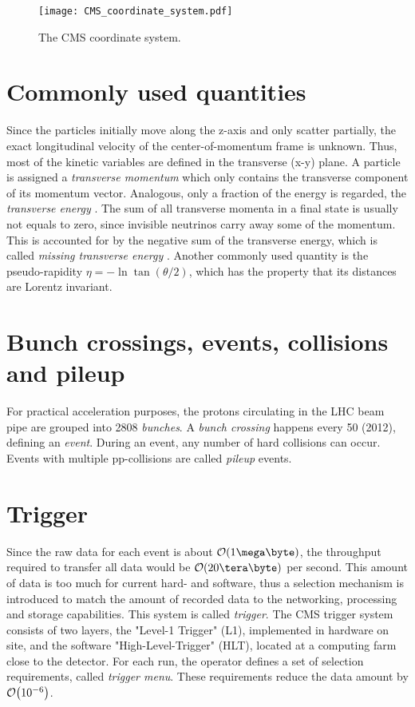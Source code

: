 \begin{figure}[htbp]
	\centering
	\texttt{[image: CMS\_coordinate\_system.pdf]}
	\caption{The CMS coordinate system.}
	\label{fig:cms_coordinate_system}
\end{figure}

\section{Commonly used quantities}
Since the particles initially move along the z-axis and only scatter partially, the exact longitudinal velocity of the center-of-momentum frame is unknown. 
Thus, most of the kinetic variables are defined in the transverse (x-y) plane. A particle is assigned a \emph{transverse momentum} \pT which only contains the transverse component of its momentum vector. Analogous, only a fraction of the energy is regarded, the \emph{transverse energy} \ET. 
The sum of all transverse momenta in a final state is usually not equals to zero, since invisible neutrinos carry away some of the momentum. This is accounted for by the negative sum of the transverse energy, which is called \emph{missing transverse energy} \MET.
Another commonly used quantity is the pseudo-rapidity $\eta = -\ln \tan(\theta/2)$, which has the property that its distances are Lorentz invariant.

\section{Bunch crossings, events, collisions and pileup}
For practical acceleration purposes, the protons circulating in the LHC beam pipe are grouped into 2808 \emph{bunches}\cite[p.4]{EB2008LHC}. A \emph{bunch crossing} happens every \unit{50}{\nano\second} (2012), defining an \emph{event}. During an event, any number of hard collisions can occur. Events with multiple pp-collisions are called \emph{pileup} events.

\section{Trigger}
Since the raw data for each event is about $\order{\unit{1}{\mega\byte}}$, the throughput required to transfer all data would be $\order{\unit{20}{\tera\byte}}$ per second. This amount of data is too much for current hard- and software, thus a selection mechanism is introduced to match the amount of recorded data to the networking, processing and storage capabilities. This system is called \emph{trigger}. The CMS trigger system consists of two layers, the "Level-1 Trigger" (L1), implemented in hardware on site, and the software "High-Level-Trigger" (HLT), located at a computing farm close to the detector. For each run, the operator defines a set of selection requirements, called \emph{trigger menu}. These requirements reduce the data amount by $\order{10^{-6}}$.

